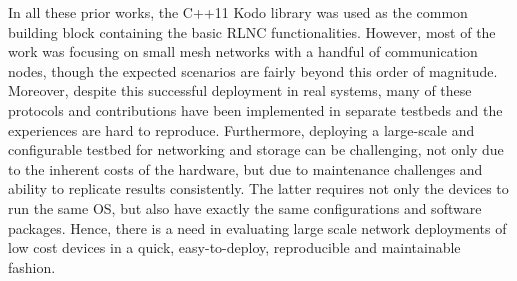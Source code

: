 In all these prior works, the C++11 Kodo library \cite{kodo2011pedersen} was used as the common building block containing the basic \ac{RLNC} functionalities. However, most of the work was focusing on small mesh networks with a handful of communication nodes, though the expected scenarios are fairly beyond this order of magnitude. Moreover, despite this successful deployment in real systems, many of these protocols and contributions have been implemented in separate testbeds and the experiences are hard to reproduce. Furthermore, deploying a large-scale and configurable testbed for networking and storage can be challenging, not only due to the inherent costs of the hardware, but due to maintenance challenges and ability to replicate results consistently. The latter requires not only the devices to run the same \ac{OS}, but also have exactly the same configurations and software packages. Hence, there is a need in evaluating large scale network deployments of low cost devices in a quick, easy-to-deploy, reproducible and maintainable fashion.

